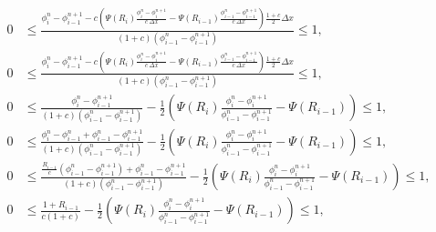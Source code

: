 \documentclass[../thesis.tex]{subfiles}
\begin{document}
\begin{equation}
    \begin{split}
        0
        &\leq
        \frac{\phi_{i}^{n} - \phi_{i-1}^{n+1}
        -c\left(
            \Psi(R_{i})\frac{\phi_{i}^{n} - \phi_{i}^{n+1}}{c~\Delta x} - \Psi(R_{i-1})\frac{\phi_{i-1}^{n} - \phi_{i-1}^{n+1}}{c~\Delta x}
            \right)\frac{1+c}{2}\Delta x}
            {(1+c)\left( \phi_{i-1}^{n} - \phi_{i-1}^{n+1} \right)}
        \leq
        1,
        \\
        0
        &\leq
        \frac{\phi_{i}^{n} - \phi_{i-1}^{n+1}
        -c\left(
            \Psi(R_{i})\frac{\phi_{i}^{n} - \phi_{i}^{n+1}}{c~\Delta x} - \Psi(R_{i-1})\frac{\phi_{i-1}^{n} - \phi_{i-1}^{n+1}}{c~\Delta x}
            \right)\frac{1+c}{2}\Delta x}
            {(1+c)\left( \phi_{i-1}^{n} - \phi_{i-1}^{n+1} \right)}
        \leq
        1,
        \\
        0
        &\leq
        \frac{\phi_{i}^{n} - \phi_{i-1}^{n+1}}
        {(1+c)\left( \phi_{i-1}^{n} - \phi_{i-1}^{n+1} \right)}
        -\frac{1}{2}\left(
            \Psi(R_{i})
            \frac{\phi_{i}^{n} - \phi_{i}^{n+1}}
            {\phi_{i-1}^{n} - \phi_{i-1}^{n+1}}
            - \Psi(R_{i-1})
            \right)
        \leq
        1,
        \\
        0
        &\leq
        \frac{\phi_{i}^{n} -\phi_{i-1}^{n} + \phi_{i-1}^{n} - \phi_{i-1}^{n+1}}
        {(1+c)\left( \phi_{i-1}^{n} - \phi_{i-1}^{n+1} \right)}
        -\frac{1}{2}\left(
            \Psi(R_{i})
            \frac{\phi_{i}^{n} - \phi_{i}^{n+1}}
            {\phi_{i-1}^{n} - \phi_{i-1}^{n+1}}
            - \Psi(R_{i-1})
            \right)
        \leq
        1,
        \\
        0
        &\leq
        \frac{\frac{R_{i-1}}{c}
        \left( \phi_{i-1}^{n} - \phi_{i-1}^{n+1} \right) + \phi_{i-1}^{n} - \phi_{i-1}^{n+1}}
        {(1+c)\left( \phi_{i-1}^{n} - \phi_{i-1}^{n+1} \right)}
        -\frac{1}{2}\left(
            \Psi(R_{i})
            \frac{\phi_{i}^{n} - \phi_{i}^{n+1}}
            {\phi_{i-1}^{n} - \phi_{i-1}^{n+1}}
            - \Psi(R_{i-1})
            \right)
        \leq
        1,
        \\
        0
        &\leq
        \frac{1 + R_{i-1}}
        {c(1+c)}
        -\frac{1}{2}\left(
            \Psi(R_{i})
            \frac{\phi_{i}^{n} - \phi_{i}^{n+1}}
            {\phi_{i-1}^{n} - \phi_{i-1}^{n+1}}
            - \Psi(R_{i-1})
            \right)
        \leq
        1,
    \end{split}
\end{equation}
\end{document}
